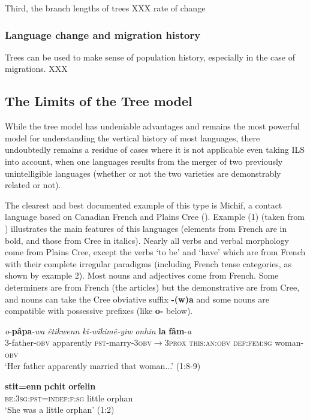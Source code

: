 \documentclass[svgnames,12pt]{scrartcl}
\newcommand{\ipa}[1]{\textbf{{\phon\mbox{#1}}}}
\begin{document}
Third, the branch lengths of trees XXX rate of change

 \subsubsection{Language change and migration history}
Trees can be used to make sense of population history, especially in the case of migrations. XXX

\subsection{The Limits of the Tree model} \label{sec:limits}
While the tree model has undeniable advantages and remains the most powerful model for understanding the vertical history of most languages, there undoubtedly remains a residue of cases where it is not applicable even taking ILS into account, when one languages results from the merger of two previously unintelligible languages (whether or not the two varieties are demonstrably related or not).

The clearest and best documented example of this type is Michif, a contact language based on Canadian French and Plains Cree (\citealt{bakker97michif}). Example (1) (taken from \citealt{antonov15michif}) illustrates the main features of this languages (elements from French are in bold, and those from Cree in italics). Nearly all verbs and verbal morphology come from Plains Cree, except the verbs `to be' and `have' which are from French with their complete irregular paradigms (including French tense categories, as shown by example 2). Most nouns and adjectives come from French. Some determiners are from French (the articles) but the demonstrative are from Cree, and nouns can take the Cree obviative suffix \ipa{-(w)a} and some nouns are compatible with possessive prefixes (like \ipa{o-} below). 

\begin{exe}
\ex \gll \textit{o}-\textbf{pâpa}-\textit{wa} \textit{êtikwenn} \textit{kî-wîkimê-yiw} \textit{onhin} \textbf{la} \textbf{fâm}-\textit{a} \\
3-father-\textsc{obv} apparently \textsc{pst}-marry-\textsc{3obv$\rightarrow$3prox} \textsc{this:an:obv} 
\textsc{def:fem:sg} woman-\textsc{obv}\\
\glt ‘Her father apparently married that woman...’ (1:8-9)
\end{exe}

\begin{exe}
\ex \gll \textbf{stit=enn} \textbf{pchit} \textbf{orfelin} \\
\textsc{be:3sg:pst=indef:f:sg} little orphan \\
\glt ‘She was a little orphan’ (1:2)
\end{exe} 
\end{document}
